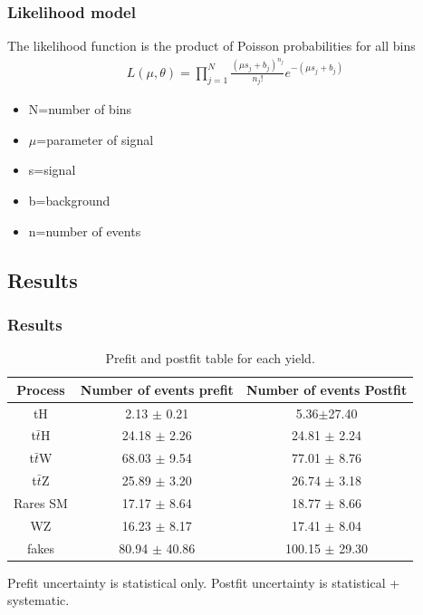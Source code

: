 \documentclass[11pt]{beamer}
\begin{document}
\begin{frame}
\frametitle{Likelihood model}
The likelihood function is the product of Poisson probabilities for all bins
\begin{align}
L(\mu,\theta)=\prod_{j=1}^{N}\frac{(\mu s_j +b_j)^{n_j}}{n_j !}e^{-(\mu s_j+b_j)}
\end{align}

\begin{itemize}
	\item	N=number of bins
	\item	$\mu$=parameter of signal
	\item	s=signal
	\item	b=background
	\item	n=number of events
\end{itemize}
\end{frame}


\begin{frame}
\section{Results}
\frametitle{Results}

\begin{table}
	\caption{Prefit and postfit table for each yield.}
\begin{tabular}{|c|c|c|}
	\hline
	Process  & Number of events prefit    & Number of events Postfit \\
	\hline
	tH & 2.13 $\pm$ 0.21  & 5.36$\pm$27.40\\
	\hline
	t$\bar{t}$H  &  24.18 $\pm$ 2.26 & 24.81 $\pm$ 2.24 \\
	\hline
	t$\bar{t}$W  &  68.03 $\pm$ 9.54 & 77.01 $\pm$ 8.76\\
	\hline
	t$\bar{t}$Z  & 25.89 $\pm$ 3.20 & 26.74 $\pm$ 3.18\\
	\hline
	Rares SM & 17.17 $\pm$ 8.64 & 18.77 $\pm$ 8.66\\
	\hline
	WZ & 16.23 $\pm$ 8.17 & 17.41 $\pm$ 8.04\\
	\hline
	fakes  & 80.94 $\pm$ 40.86  & 100.15 $\pm$ 29.30\\
	\hline
\end{tabular}	
\end{table}
 Prefit uncertainty is statistical only. Postfit uncertainty is statistical + systematic.
\end{frame}
\end{document}
